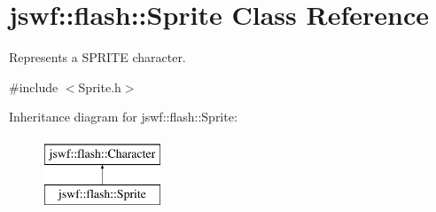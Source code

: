 \hypertarget{classjswf_1_1flash_1_1_sprite}{\section{jswf\+:\+:flash\+:\+:Sprite Class Reference}
\label{classjswf_1_1flash_1_1_sprite}
}


Represents a {\ttfamily S\+P\+R\+I\+T\+E} character.  




{\ttfamily \#include $<$Sprite.\+h$>$}

Inheritance diagram for jswf\+:\+:flash\+:\+:Sprite\+:\begin{figure}[H]
\begin{center}
\leavevmode
\includegraphics[height=2.000000cm]{classjswf_1_1flash_1_1_sprite}
\end{center}
\end{figure}
